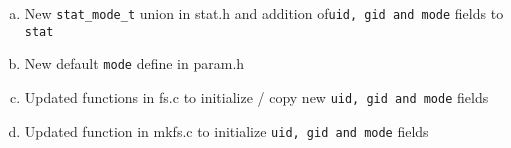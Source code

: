 \documentclass[11pt,letterpaper]{report}
\begin{document}
\begin{enumerate}[(a)]
                                                                                                                                                                                                                                                                                                                                                                                                  \item New {\tt stat\_mode\_t} union in stat.h and addition of{\tt uid, gid and mode} fields to {\tt stat}
                                                                                                                                                                                                                                                                                                                                                                                                        \item  New default {\tt mode} define in param.h
                                                                                                                                                                                                                                                                                                                                                                                                              \item Updated functions in fs.c to initialize / copy new {\tt uid, gid and mode} fields
                                                                                                                                                                                                                                                                                                                                                                                                                    \item Updated function in mkfs.c to initialize {\tt uid, gid and mode} fields
                                                                                                                                                                                                                                                                                                                                                                                                                      \end{enumerate}
\end{document}
